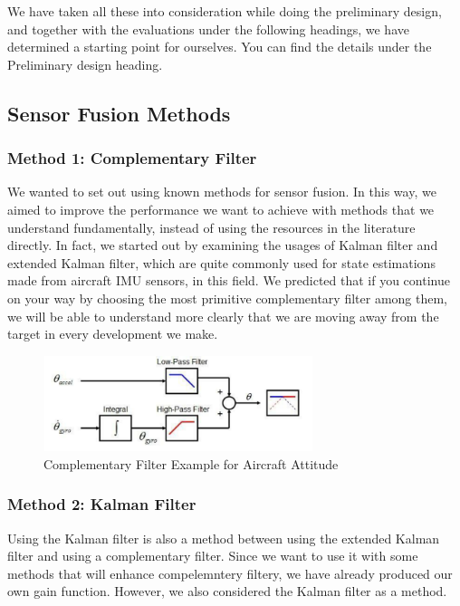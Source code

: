 \documentclass[12pt]{article}
\begin{document}
We have taken all these into consideration while doing the preliminary design, and together with the evaluations under the following headings, we have determined a starting point for ourselves. You can find the details under the Preliminary design heading.



\subsection{Sensor Fusion Methods}

\subsubsection{Method 1: Complementary Filter}
We wanted to set out using known methods for sensor fusion. In this way, we aimed to improve the performance we want to achieve with methods that we understand fundamentally, instead of using the resources in the literature directly. In fact, we started out by examining the usages of Kalman filter and extended Kalman filter, which are quite commonly used for state estimations made from aircraft IMU sensors, in this field. We predicted that if you continue on your way by choosing the most primitive complementary filter among them, we will be able to understand more clearly that we are moving away from the target in every development we make.

\begin{figure}[H]
    \centering
    \includegraphics[width=0.7\textwidth]{CF.png}
    \caption{Complementary Filter Example for Aircraft Attitude}
\end{figure}

\subsubsection{Method 2: Kalman Filter}
Using the Kalman filter is also a method between using the extended Kalman filter and using a complementary filter. Since we want to use it with some methods that will enhance compelemntery filtery, we have already produced our own gain function. However, we also considered the Kalman filter as a method.
\end{document}
